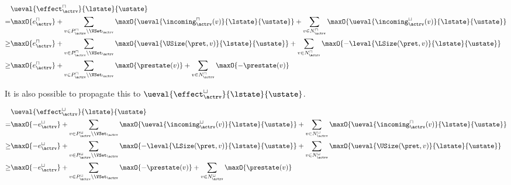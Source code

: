 \begin{equation} \label{eq:input_rv_reduction_upper}
  \begin{split}
  & \ueval{\effect^\sqcap_\actrv}{\lstate}{\ustate} \\
  = & \maxO{e^{\sqcap}_\actrv}
    + \sum_{v \in P_\actrv^\sqcap \setminus \VSet_\actrv} \maxO{\ueval{\incoming^\sqcap_\actrv(v)}{\lstate}{\ustate}}
    + \sum_{v \in N_\actrv^\sqcap} \maxO{\ueval{\incoming^\sqcup_\actrv(v)}{\lstate}{\ustate}} \\
  \geq & \maxO{e^{\sqcap}_\actrv}
    + \sum_{v \in P_\actrv^\sqcap \setminus \VSet_\actrv} \maxO{\ueval{\USize(\pret, v)}{\lstate}{\ustate}}
    + \sum_{v \in N_\actrv^\sqcap} \maxO{-\leval{\LSize(\pret, v)}{\lstate}{\ustate}} \\
  \geq & \maxO{e^{\sqcap}_\actrv}
    + \sum_{v \in P_\actrv^\sqcap \setminus \VSet_\actrv} \maxO{\prestate(v)}
    + \sum_{v \in N_\actrv^\sqcap} \maxO{-\prestate(v)} \\
  \end{split}
\end{equation}

It is also possible to propagate this to $\ueval{\effect^\sqcup_\actrv}{\lstate}{\ustate}$.

\begin{equation} \label{eq:input_rv_reduction_lower}
  \begin{split}
  & \ueval{\effect^\sqcup_\actrv}{\lstate}{\ustate} \\
  = & \maxO{-e^{\sqcup}_\actrv}
    + \sum_{v \in P_\actrv^\sqcup \setminus \VSet_\actrv} \maxO{\ueval{\incoming^\sqcup_\actrv(v)}{\lstate}{\ustate}}
    + \sum_{v \in N_\actrv^\sqcup} \maxO{\ueval{\incoming^\sqcap_\actrv(v)}{\lstate}{\ustate}} \\
  \geq & \maxO{-e^{\sqcup}_\actrv}
    + \sum_{v \in P_\actrv^\sqcup \setminus \VSet_\actrv} \maxO{-\leval{\LSize(\pret, v)}{\lstate}{\ustate}}
    + \sum_{v \in N_\actrv^\sqcup} \maxO{\ueval{\USize(\pret, v)}{\lstate}{\ustate}} \\
  \geq & \maxO{-e^{\sqcup}_\actrv}
    + \sum_{v \in P_\actrv^\sqcup \setminus \VSet_\actrv} \maxO{-\prestate(v)}
    + \sum_{v \in N_\actrv^\sqcup} \maxO{\prestate(v)} \\
  \end{split}
\end{equation}

